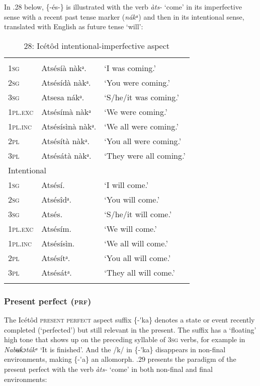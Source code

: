 \begin{table}
In .28 below, \{-és-\} is illustrated with the verb \textit{àts- }‘come’ in its imperfective sense with a recent past tense marker (\textit{nákᵃ}) and then in its intentional sense, translated with English as future tense ‘will’:


\begin{table}
\caption{28: Icétôd intentional-imperfective aspect}
\label{tab:8}


\begin{tabularx}{\textwidth}{XXX}
\lsptoprule

\multicolumn{2}{X}{Imperfective} & \\
\textsc{1sg} & Atsésíà nàkᵃ. & ‘I was coming.’\\
\textsc{2sg} & Atsésídà nàkᵃ. & ‘You were coming.’\\
\textsc{3sg} & Atsesa nákᵃ. & ‘S/he/it was coming.’\\
\textsc{1pl.exc} & Atsésímà nàkᵃ & ‘We were coming.’\\
\textsc{1pl.inc} & Atsésísìnà nàkᵃ. & ‘We all were coming.’\\
\textsc{2pl} & Atsésítà nàkᵃ. & ‘You all were coming.’\\
\textsc{3pl} & Atsésátà nàkᵃ. & ‘They were all coming.’\\
\multicolumn{2}{X}{Intentional} & \\
\textsc{1sg} & Atsésí. & ‘I will come.’\\
\textsc{2sg} & Atsésîdᵃ. & ‘You will come.’\\
\textsc{3sg} & Atsés. & ‘S/he/it will come.’\\
\textsc{1pl.exc} & Atsésím. & ‘We will come.’\\
\textsc{1pl.inc} & Atsésísìn. & ‘We all will come.’\\
\textsc{2pl} & Atsésítᵃ. & ‘You all will come.’\\
\textsc{3pl} & Atsésátᵃ. & ‘They all will come.’\\
\lspbottomrule
\end{tabularx}
\end{table}

\subsubsection{Present perfect (\textsc{prf})}

The Icétôd \textsc{present perfect} aspect suffix \{-\'{ }ka\} denotes a state or event recently completed (‘perfected’) but still relevant in the present. The suffix has a ‘floating’ high tone that shows up on the preceding syllable of 3\textsc{sg }verbs, for example in \textit{Nabʉƙɔtákᵃ} ‘It is finished’. And the /k/ in \{-\'{ }ka\} disappears in non-final environments, making \{-\'{ }a\} an allomorph. .29 presents the paradigm of the present perfect with the verb \textit{àts- }‘come’ in both non-final and final environments:



\end{table}
